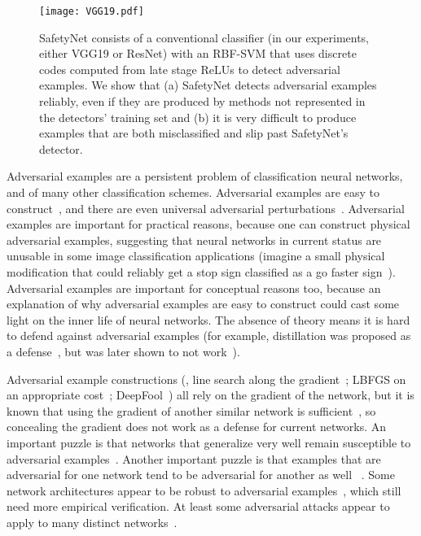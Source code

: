 \documentclass[10pt,twocolumn,letterpaper]{article}
\begin{document}
\begin{figure}[ht]
\centerline{\texttt{[image: VGG19.pdf]}}
  \caption{SafetyNet consists of a conventional classifier (in our
    experiments, either VGG19 or ResNet) with an RBF-SVM that uses discrete codes
computed from late stage ReLUs to detect adversarial examples. We show that (a) SafetyNet detects adversarial examples
reliably, even if they are produced by methods not represented in the detectors' training set and (b) it is very
difficult to produce examples that are both misclassified and slip past SafetyNet's detector.
  \label{fig:detector}}
\end{figure}

Adversarial examples are a persistent problem of classification neural networks, and of many other classification schemes. 
Adversarial examples are easy to construct~\cite{szegedy2013intriguing,nguyen2015deep,carlini2016towards}, and there are even universal adversarial 
perturbations~\cite{moosavi2016universal}.  Adversarial examples are important for practical reasons, because one can
construct physical adversarial examples, suggesting that neural networks in current status are unusable in
some image classification applications (\eg imagine a small physical modification that could reliably get a stop sign classified
as a go faster sign~\cite{papernot2016practical,lu2017no}).   Adversarial examples are important for conceptual reasons too,
because an explanation of why adversarial examples are easy to construct could cast some light on the inner life of
neural networks.  The absence of theory means it is hard to defend against adversarial examples (for example, distillation was proposed as a
defense~\cite{papernot2016distillation}, but was later shown to not work~\cite{carlini2016defensive}).  

Adversarial example constructions (\eg, line search along the gradient~\cite{goodfellow2014explaining}; LBFGS on an
appropriate cost~\cite{szegedy2013intriguing}; DeepFool~\cite{moosavi2016deepfool}) all  rely on the 
gradient of the network, but it is known that using the gradient of another similar network is
sufficient~\cite{papernot2016practical}, so concealing the gradient does not work as a defense for current networks.    
An important puzzle is that networks that generalize very well remain susceptible to adversarial
examples~\cite{szegedy2013intriguing}.  Another important puzzle is that examples  
that are adversarial for one network tend to be adversarial for another as well
~\cite{szegedy2013intriguing,Song2016,papernottransfer}. Some network architectures 
appear to be robust to adversarial examples~\cite{krotov2017}, which still need more empirical verification.
At least some adversarial attacks appear to apply to many distinct networks~\cite{moosavi2016universal}.
\end{document}
